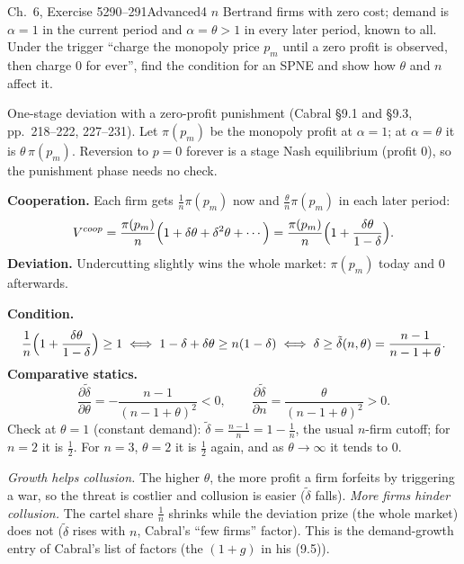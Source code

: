 \begin{exsol}{\MG{} Ch.~6, Exercise 5}{290--291}{Advanced}{4}
\asked $n$ Bertrand firms with zero cost; demand is $\alpha = 1$ in the current period and $\alpha = \theta > 1$
in every later period, known to all. Under the trigger ``charge the monopoly price $p_m$ until a zero profit is
observed, then charge $0$ for ever'', find the condition for an SPNE and show how $\theta$ and $n$ affect it.

\method One-stage deviation with a zero-profit punishment (Cabral \S9.1 and \S9.3, pp.~218--222, 227--231). Let
$\pi(p_m)$ be the monopoly profit at $\alpha = 1$; at $\alpha = \theta$ it is $\theta\,\pi(p_m)$. Reversion to $p = 0$
forever is a stage Nash equilibrium (profit $0$), so the punishment phase needs no check.

\solution
\textbf{Cooperation.} Each firm gets $\frac1n\pi(p_m)$ now and $\frac{\theta}{n}\pi(p_m)$ in each later period:
\[
  V^{coop} = \frac{\pi(p_m)}{n}\Bigl(1 + \delta\theta + \delta^2\theta + \cdots\Bigr)
  = \frac{\pi(p_m)}{n}\Bigl(1 + \frac{\delta\theta}{1-\delta}\Bigr).
\]
\textbf{Deviation.} Undercutting slightly wins the whole market: $\pi(p_m)$ today and $0$ afterwards.

\textbf{Condition.}
\[
  \frac{1}{n}\Bigl(1 + \frac{\delta\theta}{1-\delta}\Bigr) \ge 1
  \iff 1 - \delta + \delta\theta \ge n(1-\delta)
  \iff \delta \ge \tilde\delta(n,\theta) = \frac{n-1}{n-1+\theta} .
\]
\textbf{Comparative statics.}
\[
  \frac{\partial\tilde\delta}{\partial\theta} = -\frac{n-1}{(n-1+\theta)^2} < 0, \qquad
  \frac{\partial\tilde\delta}{\partial n} = \frac{\theta}{(n-1+\theta)^2} > 0 .
\]
Check at $\theta = 1$ (constant demand): $\tilde\delta = \frac{n-1}{n} = 1 - \frac1n$, the usual $n$-firm cutoff; for
$n = 2$ it is $\frac12$. For $n = 3$, $\theta = 2$ it is $\frac12$ again, and as $\theta \to \infty$ it tends to $0$.

\interp \emph{Growth helps collusion.} The higher $\theta$, the more profit a firm forfeits by triggering a war, so the
threat is costlier and collusion is easier ($\tilde\delta$ falls). \emph{More firms hinder collusion.} The
cartel share $\frac1n$ shrinks while the deviation prize (the whole market) does not ($\tilde\delta$ rises with
$n$, Cabral's ``few firms'' factor). This is the demand-growth entry of Cabral's list of factors (the
$(1+g)$ in his (9.5)).


\end{exsol}
